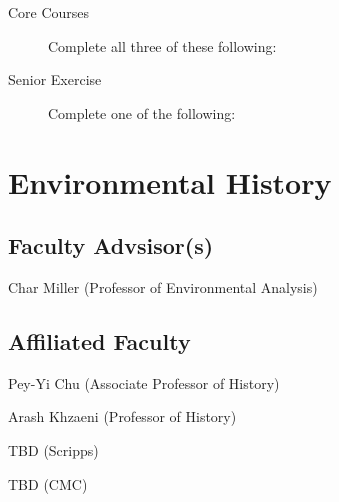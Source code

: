 \documentclass{article}\usepackage[]{graphicx}\usepackage[]{xcolor}
\newenvironment{itemize*}%
  {\begin{itemize}%
    \setlength{\itemsep}{0pt}%
    \setlength{\parskip}{0pt}}%
  {\end{itemize}}
\begin{document}
\begin{description}

 \item[Core Courses] Complete all three of these following:
  

  \item[Senior Exercise] Complete one of the following:
  




\end{description}

\newpage %
\section{Environmental History}



\subsection{Faculty Advsisor(s)}

\begin{itemize*}
  \item Char Miller (Professor of Environmental Analysis)
\end{itemize*}

\subsection{Affiliated Faculty}

\begin{itemize*}
  \item Pey-Yi Chu (Associate Professor of History)
  \item Arash Khzaeni (Professor of History)
  \item TBD (Scripps)
  \item TBD (CMC)
  \item 
\end{itemize*}
\end{document}
